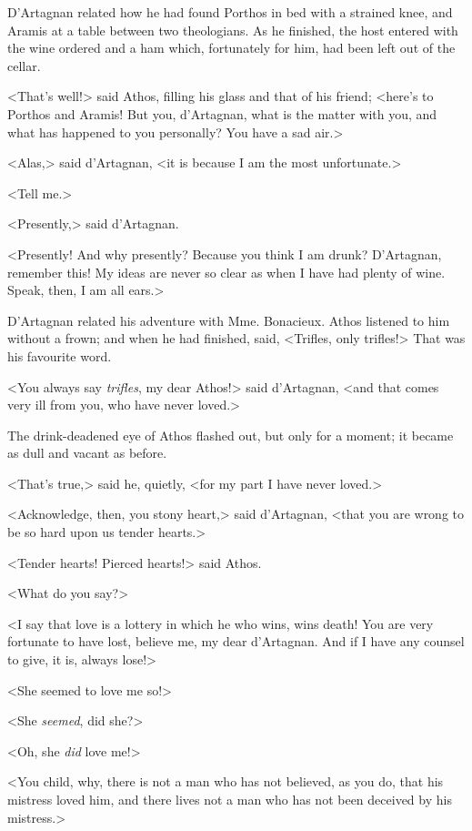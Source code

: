 D'Artagnan related how he had found Porthos in bed with a strained knee, and Aramis at a table between two theologians. As he finished, the host entered with the wine ordered and a ham which, fortunately for him, had been left out of the cellar. 

<That's well!> said Athos, filling his glass and that of his friend; <here's to Porthos and Aramis! But you, d'Artagnan, what is the matter with you, and what has happened to you personally? You have a sad air.> 

<Alas,> said d'Artagnan, <it is because I am the most unfortunate.> 

<Tell me.> 

<Presently,> said d'Artagnan. 

<Presently! And why presently? Because you think I am drunk? D'Artagnan, remember this! My ideas are never so clear as when I have had plenty of wine. Speak, then, I am all ears.> 

D'Artagnan related his adventure with Mme. Bonacieux. Athos listened to him without a frown; and when he had finished, said, <Trifles, only trifles!> That was his favourite word. 

<You always say \textit{trifles}, my dear Athos!> said d'Artagnan, <and that comes very ill from you, who have never loved.> 

The drink-deadened eye of Athos flashed out, but only for a moment; it became as dull and vacant as before. 

<That's true,> said he, quietly, <for my part I have never loved.> 

<Acknowledge, then, you stony heart,> said d'Artagnan, <that you are wrong to be so hard upon us tender hearts.> 

<Tender hearts! Pierced hearts!> said Athos. 

<What do you say?> 

<I say that love is a lottery in which he who wins, wins death! You are very fortunate to have lost, believe me, my dear d'Artagnan. And if I have any counsel to give, it is, always lose!> 

<She seemed to love me so!> 

<She \textit{seemed}, did she?> 

<Oh, she \textit{did} love me!> 

<You child, why, there is not a man who has not believed, as you do, that his mistress loved him, and there lives not a man who has not been deceived by his mistress.> 


